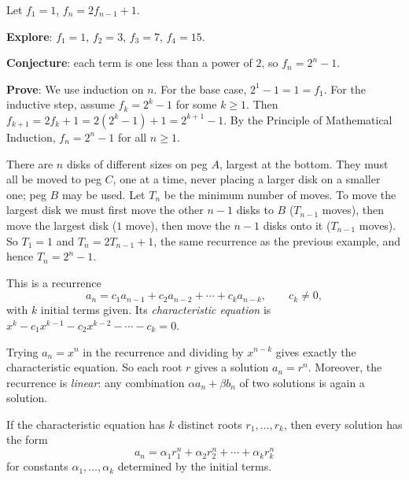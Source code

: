 \begin{example}
Let $f_1=1$, $f_n = 2f_{n-1}+1$.

\textbf{Explore}: $f_1=1$, $f_2=3$, $f_3=7$, $f_4=15$.

\textbf{Conjecture}: each term is one less than a power of $2$, so $f_n = 2^n-1$.

\textbf{Prove}: We use induction on $n$. For the base case, $2^1-1=1=f_1$. For the inductive step, assume $f_k=2^k-1$ for some $k\ge1$. Then $f_{k+1} = 2f_k+1 = 2(2^k-1)+1 = 2^{k+1}-1$. By the Principle of Mathematical Induction, $f_n=2^n-1$ for all $n\ge1$.
\end{example}

\begin{example}
There are $n$ disks of different sizes on peg $A$, largest at the bottom. They must all be moved to peg $C$, one at a time, never placing a larger disk on a smaller one; peg $B$ may be used. Let $T_n$ be the minimum number of moves. To move the largest disk we must first move the other $n-1$ disks to $B$ ($T_{n-1}$ moves), then move the largest disk ($1$ move), then move the $n-1$ disks onto it ($T_{n-1}$ moves). So $T_1=1$ and $T_n=2T_{n-1}+1$, the same recurrence as the previous example, and hence $T_n=2^n-1$.
\end{example}

\bigskip
\begin{definition}
This is a recurrence
\[
a_n = c_1a_{n-1}+c_2a_{n-2}+\cdots+c_ka_{n-k}, \qquad c_k \neq 0,
\]
with $k$ initial terms given. Its \emph{characteristic equation} is $x^k - c_1x^{k-1}-c_2x^{k-2}-\cdots-c_k = 0$.
\end{definition}

\begin{note}
Trying $a_n=x^n$ in the recurrence and dividing by $x^{n-k}$ gives exactly the characteristic equation. So each root $r$ gives a solution $a_n=r^n$. Moreover, the recurrence is \emph{linear}: any combination $\alpha a_n+\beta b_n$ of two solutions is again a solution.
\end{note}

\begin{theorem}\label{thm:distinct-roots}
If the characteristic equation has $k$ distinct roots $r_1,\dots,r_k$, then every solution has the form
\[
a_n = \alpha_1 r_1^n + \alpha_2 r_2^n + \cdots + \alpha_k r_k^n
\]
for constants $\alpha_1,\dots,\alpha_k$ determined by the initial terms.
\end{theorem}

